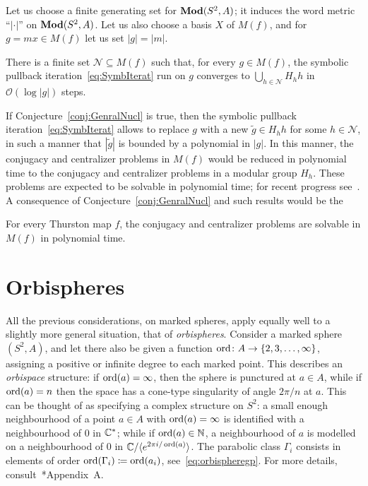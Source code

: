 \documentclass{amsart}
\begin{document}
Let us choose a finite generating set for $\mathbf{\relax Mod}(S^2,A)$; it induces
the word metric ``$|\cdot|$'' on $\mathbf{\relax Mod}(S^2,A)$. Let us also choose a
basis $X$ of $M(f)$, and for $g = m x\in M(f)$ let us set $|g|=|m|$.

\begin{conj}\label{conj:GenralNucl}
  There is a finite set $\mathscr N\subseteq M(f)$ such that, for
  every $g\in M(f)$, the symbolic pullback
  iteration~\eqref{eq:SymbIterat} run on $g$ converges to
  $\bigcup_{h\in\mathscr N}H_h h$ in $\mathcal O(\log |g|)$ steps.
\end{conj}
If Conjecture~\ref{conj:GenralNucl} is true, then the symbolic
pullback iteration~\eqref{eq:SymbIterat} allows to replace $g$ with a
new $\tilde g \in H_h h$ for some $h\in\mathscr N$, in such a manner
that $|\tilde g|$ is bounded by a polynomial in $|g|$. In this manner,
the conjugacy and centralizer problems in $M(f)$ would be reduced in
polynomial time to the conjugacy and centralizer problems in a modular
group $H_h$. These problems are expected to be solvable in polynomial
time; for recent progress see~\cite{bell-webb:poly,calvez:NT}. A
consequence of Conjecture~\ref{conj:GenralNucl} and such results would
be the
\begin{conj}\label{conj:p}
  For every Thurston map $f$, the conjugacy and centralizer problems
  are solvable in $M(f)$ in polynomial time.
\end{conj}

\section{Orbispheres}\label{ss:orbispheres}
All the previous considerations, on marked spheres, apply equally well
to a slightly more general situation, that of
\emph{orbispheres}. Consider a marked sphere $(S^2,A)$, and let there
also be given a function $\operatorname{ord}\colon A\to\{2,3,\dots,\infty\}$,
assigning a positive or infinite degree to each marked point. This
describes an \emph{orbispace} structure: if $\operatorname{ord}(a)=\infty$, then the
sphere is punctured at $a\in A$, while if $\operatorname{ord}(a)=n$ then the space
has a cone-type singularity of angle $2\pi/n$ at $a$.  This can be
thought of as specifying a complex structure on $S^2$: a small enough
neighbourhood of a point $a\in A$ with $\operatorname{ord}(a)=\infty$ is identified
with a neighbourhood of $0$ in ${\mathbb C}^*$; while if $\operatorname{ord}(a)\in{\mathbb N}$, a
neighbourhood of $a$ is modelled on a neighbourhood of $0$ in
${\mathbb C}/\langle e^{2\pi i/\operatorname{ord}(a)}\rangle$. The parabolic class $\Gamma_i$
consists in elements of order $\operatorname{ord}(\Gamma_i)\coloneqq\operatorname{ord}(a_i)$,
see~\eqref{eq:orbispheregp}.  For more details,
consult~\cite{mcmullen:renormalization}*{Appendix~A}.
\end{document}
